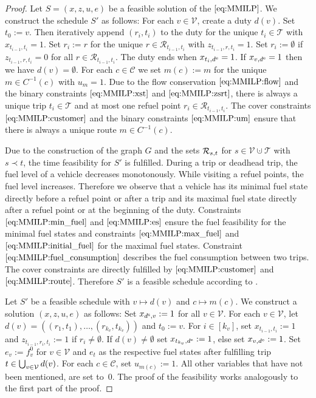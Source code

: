 \begin{proof}

Let ${S=(x,z,u,e)}$ be a feasible solution of the $\eqref{eq:MMILP}$. We construct the schedule $S'$ as follows: For each ${v\in\mathcal{V}}$, create a duty $d(v)$. Set ${t_0:=v}$. Then iteratively append $\left(r_i,t_i\right)$ to the duty for the unique ${t_i\in\mathcal{T}}$ with ${x_{t_{i-1},t_i}=1}$. Set ${r_i:=r}$ for the unique ${r\in\mathcal{R}_{t_{i-1},t_i}}$ with ${z_{t_{i-1},r,t_i}=1}$. Set ${r_i:=\emptyset}$ if ${z_{t_{i-1},r,t_i}=0}$ for all ${r\in\mathcal{R}_{t_{i-1},t_i}}$. The duty ends when ${x_{t_i,d^{\operatorname{e}}}=1}$. If ${x_{v,d^{\operatorname{e}}}=1}$ then we have ${d(v)=\emptyset}$. For each ${c\in\mathcal{C}}$ we set ${m(c):=m}$ for the unique ${m\in C^{-1}(c)}$ with ${u_m=1}$. Due to the flow conservation $\eqref{eq:MMILP:flow}$ and the binary constraints $\eqref{eq:MMILP:xst}$ and $\eqref{eq:MMILP:zsrt}$, there is always a unique trip ${t_i\in\mathcal{T}}$ and at most one refuel point ${r_i\in\mathcal{R}_{t_{i-1},t_i}}$. The cover constraints $\eqref{eq:MMILP:customer}$ and the binary constraints $\eqref{eq:MMILP:um}$ ensure that there is always a unique route ${m\in C^{-1}(c)}$.

Due to the construction of the graph $G$ and the sets $\mathcal{R}_{s,t}$ for ${s\in\mathcal{V}\cupdot\mathcal{T}}$ with $s\prec t$, the time feasibility for $S'$ is fulfilled. During a trip or deadhead trip, the fuel level of a vehicle decreases monotonously. While visiting a refuel points, the fuel level increases. Therefore we observe that a vehicle has its minimal fuel state directly before a refuel point or after a trip and its maximal fuel state directly after a refuel point or at the beginning of the duty. Constraints $\eqref{eq:MMILP:min_fuel}$ and $\eqref{eq:MMILP:es}$ ensure the fuel feasibility for the minimal fuel states and constraints $\eqref{eq:MMILP:max_fuel}$ and $\eqref{eq:MMILP:initial_fuel}$ for the maximal fuel states. Constraint $\eqref{eq:MMILP:fuel_consumption}$ describes the fuel consumption between two trips. The cover constraints are directly fulfilled by $\eqref{eq:MMILP:customer}$ and $\eqref{eq:MMILP:route}$. Therefore $S'$ is a feasible schedule according to .

Let $S'$ be a feasible schedule with $v\mapsto d(v)$ and $c\mapsto m(c)$. We construct a solution $(x,z,u,e)$ as follows: Set ${x_{d^{\operatorname{s}},v}:=1}$ for all ${v\in\mathcal{V}}$. For each ${v\in\mathcal{V}}$, let\linebreak
${d(v)=\left(\left(r_1,t_1\right),\dots,\left(r_{k_v},t_{k_v}\right)\right)}$ and ${t_0:= v}$. For ${i\in\left[k_v\right]}$, set ${x_{t_{i-1},t_i}:=1}$ and\linebreak
${z_{t_{i-1},r_i,t_i}:=1}$ if ${r_i\neq\emptyset}$. If ${d(v)\neq\emptyset}$ set ${x_{t_{k_v},d^{\operatorname{e}}}:=1}$, else set ${x_{v,d^{\operatorname{e}}}:=1}$. Set ${e_v:=f^0_v}$ for ${v\in\mathcal{V}}$ and $e_t$ as the respective fuel states after fulfilling trip ${t\in\bigcup_{v\in\mathcal{V}} d(v)}$. For each ${c\in\mathcal{C}}$, set ${u_{m(c)}:=1}$. All other variables that have not been mentioned, are set to~$0$. The proof of the feasibility works analogously to the first part of the proof.


\end{proof}

